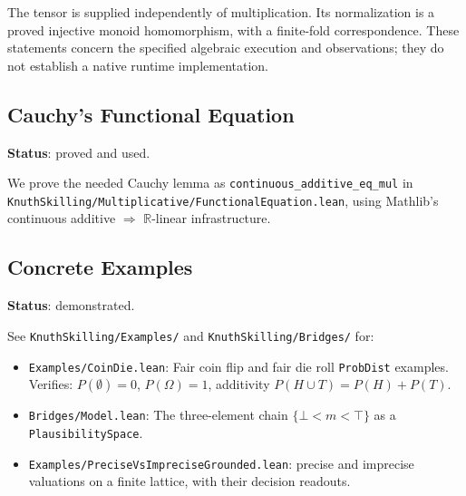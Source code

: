 \documentclass[11pt]{article}
\theoremstyle{definition}
\theoremstyle{remark}
\begin{document}
The tensor is supplied independently of multiplication. Its normalization
is a proved injective monoid homomorphism, with a finite-fold correspondence.
These statements concern the specified algebraic execution and observations;
they do not establish a native runtime implementation.

\subsection{Cauchy's Functional Equation}

\textbf{Status}: proved and used.

We prove the needed Cauchy lemma as
\texttt{continuous\_additive\_eq\_mul} in
\texttt{KnuthSkilling/Multiplicative/FunctionalEquation.lean},
using Mathlib’s continuous additive $\Rightarrow$ $\mathbb{R}$-linear infrastructure.

\subsection{Concrete Examples}

\textbf{Status}: demonstrated.

See \texttt{KnuthSkilling/Examples/} and \texttt{KnuthSkilling/Bridges/} for:
\begin{itemize}
\item \texttt{Examples/CoinDie.lean}: Fair coin flip and fair die roll \texttt{ProbDist} examples.
  Verifies: $P(\emptyset)=0$, $P(\Omega)=1$, additivity $P(H \cup T) = P(H) + P(T)$.
\item \texttt{Bridges/Model.lean}: The three-element chain $\{\bot < m < \top\}$ as a \texttt{PlausibilitySpace}.
\item \texttt{Examples/PreciseVsImpreciseGrounded.lean}: precise and imprecise
  valuations on a finite lattice, with their decision readouts.
\end{itemize}
\end{document}
